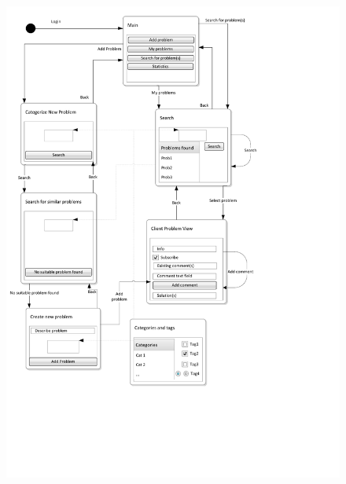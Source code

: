 \begin{figure}[htb]
\begin{center}
 \includegraphics[width = \textwidth , clip=true, trim=0 5cm 5cm 0]{input/application_domain_analysis/Navigation_DiagramClient.pdf}
\caption{\cinterface[]}
\label{fig:client_interface}
\end{center}
\end{figure}




